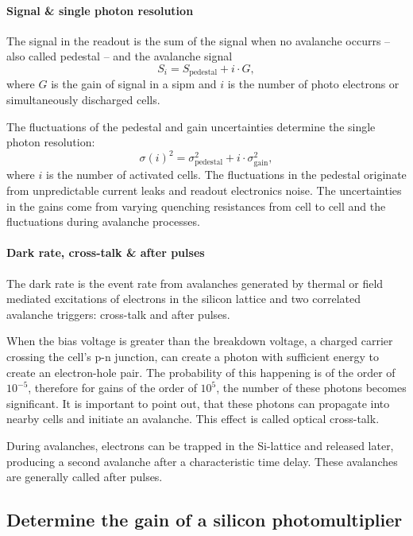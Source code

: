 \paragraph{Signal \& single photon resolution}
The signal in the readout is the sum of the signal when no avalanche occurrs -- also called pedestal -- and the avalanche signal
\begin{equation*}
	S_i = S_\text{pedestal} + i \cdot G,
\end{equation*}
where $G$ is the gain of signal in a \gls{sipm} and $i$ is the number of photo electrons or simultaneously discharged cells.

The fluctuations of the pedestal and gain uncertainties determine the single photon resolution:
\begin{equation*}
  \sigma(i)^2 = \sigma^2_\text{pedestal} + i \cdot \sigma^2_\text{gain},
\end{equation*}
where $i$ is the number of activated cells.
The fluctuations in the pedestal originate from unpredictable current leaks and readout electronics noise.
The uncertainties in the gains come from varying quenching resistances from cell to cell and the fluctuations during avalanche processes.

\paragraph{Dark rate, cross-talk \& after pulses} The dark rate is the event rate from avalanches generated by thermal or field mediated excitations of electrons in the silicon lattice and two correlated avalanche triggers: cross-talk and after pulses.

When the bias voltage is greater than the breakdown voltage, a charged carrier crossing the cell's p-n junction, can create a photon with sufficient energy to create an electron-hole pair.
The probability of this happening is of the order of $10^{-5}$, therefore for gains of the order of $10^5$, the number of these photons becomes significant\cite{1206.4154}.
It is important to point out, that these photons can propagate into nearby cells and initiate an avalanche.
This effect is called optical cross-talk.

During avalanches, electrons can be trapped in the Si-lattice and released later, producing a second avalanche after a characteristic time delay.
These avalanches are generally called after pulses.


\subsection{Determine the gain of a silicon photomultiplier}

